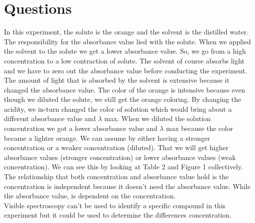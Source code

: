 \documentclass[10pt]{article}
\begin{document}
\section{Questions}
\hspace{5ex}In this experiment, the solute is the orange and the solvent is the distilled water. The responsibility for the absorbance value lied with the solute. When we applied the solvent to the solute  we get a lower absorbance value. So, we go from a high concentration to a low contraction of solute. The solvent of course absorbs light and we have to zero out the absorbance value before conducting the experiment. The amount of light that is absorbed by the solvent is extensive because it changed the absorbance value. The color of the orange is intensive because even though we diluted the solute, we still get the orange coloring. By changing the acidity, we in-turn changed the color of solution which would bring about a different absorbance value and $\lambda$ max. When we diluted the solution concentration we got a lower absorbance value and $\lambda$ max because the color became a lighter orange. We can assume by either having a stronger concentration or a weaker concentration (diluted). That we will get higher absorbance values (stronger concentration) or lower absorbance values (weak concentration). We can see this by looking at Table 2 and Figure 1 collectively. The relationship that both concentration and absorbance value hold is the concentration is independent because it doesn't need the absorbance value. While the absorbance value, is dependent on the concentration. \\

\hspace{5ex}Visible spectroscopy can't be used to identify a specific compound in this experiment but it could be used to determine the differences concentration.
\end{document}
